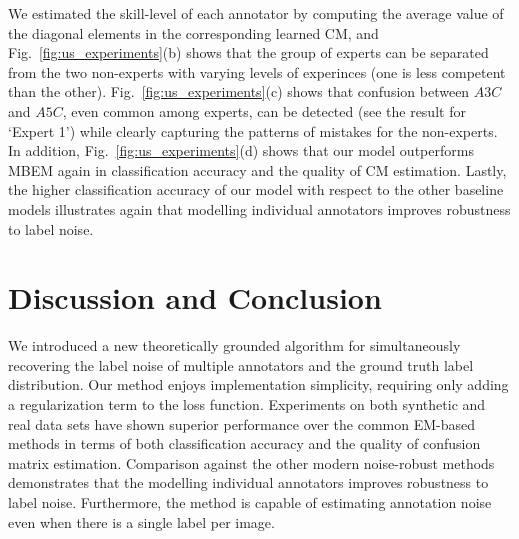 We estimated the skill-level of each annotator by computing the average value of the diagonal elements in the corresponding learned CM, and Fig.~\ref{fig:us_experiments}(b) shows that the group of experts can be separated from the two non-experts with varying levels of experinces (one is less competent than the other). Fig.~\ref{fig:us_experiments}(c) shows that confusion between $A3C$ and $A5C$, even common among experts, can be detected (see the result for `Expert 1') while clearly capturing the patterns of mistakes for the non-experts. In addition, Fig.~\ref{fig:us_experiments}(d) shows that our model outperforms MBEM \cite{khetan2017learning} again in classification accuracy and the quality of CM estimation. Lastly, the higher classification accuracy of our model with respect to the other baseline models illustrates again that modelling individual annotators improves robustness to label noise. 


\vspace{-2mm}
\section{Discussion and Conclusion}
\vspace{-2mm}

We introduced a new theoretically grounded algorithm for simultaneously recovering the label noise of multiple annotators and the ground truth label distribution. Our method enjoys implementation simplicity, requiring only adding a regularization term to the loss function. Experiments on both synthetic and real data sets have shown superior performance over the common EM-based methods in terms of both classification accuracy and the quality of confusion matrix estimation. Comparison against the other modern noise-robust methods demonstrates that the modelling individual annotators improves robustness to label noise. Furthermore, the method is capable of estimating annotation noise even when there is a single label per image. 

